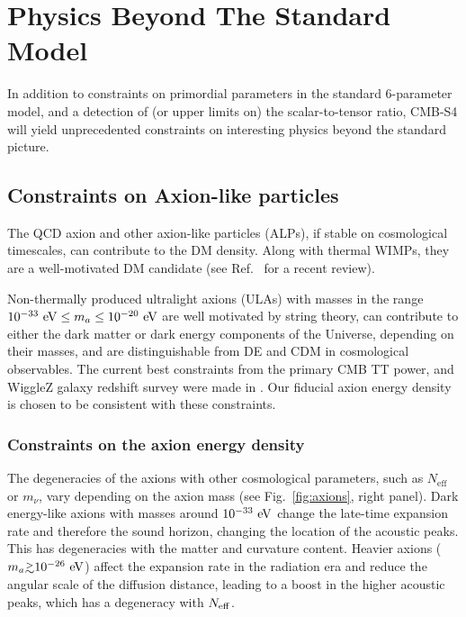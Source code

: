 

\chapter{Physics Beyond The Standard Model}

In addition to constraints on primordial parameters in the standard 6-parameter model, and a detection of (or upper limits on) the scalar-to-tensor ratio, CMB-S4 will yield unprecedented constraints on interesting physics beyond the standard picture. 

\section{Constraints on Axion-like particles}
The QCD axion and other axion-like particles (ALPs), if stable on cosmological timescales, can contribute to the DM density. Along with thermal WIMPs, they are a well-motivated DM candidate (see Ref.~\cite{Marsh:2015xka} for a recent review).

Non-thermally produced ultralight axions (ULAs) with masses in the range $10^{-33}~{\rm eV}\leq m_{a}\leq 10^{-20}~{\rm eV}$ are well motivated by string theory, can contribute to either the dark matter or dark energy components of the Universe, depending on their masses, and are distinguishable from DE and CDM in cosmological observables. The current best constraints from the primary CMB TT power, and WiggleZ galaxy redshift survey were made in \cite{hlozek:2015axa}. Our fiducial axion energy density is chosen to be consistent with these constraints. 
\subsection{Constraints on the axion energy density}
The degeneracies of the axions with other cosmological parameters, such as $N_\mathrm{eff}$ or $m_\nu$, vary depending on the axion mass (see Fig.~\ref{fig:axions}, right panel). Dark energy-like axions with masses around $10^{-33}~{\rm eV}$ change the late-time expansion rate and therefore the sound horizon, changing the location of the acoustic peaks. This has degeneracies with the matter and curvature content. 
Heavier axions ($m_a \gtrsim 10^{-26}~{\rm eV}$) affect the expansion rate in the radiation era and reduce the angular scale of the diffusion distance, leading to a boost in the higher acoustic peaks, which has a degeneracy with $N_{\rm eff}$. 

